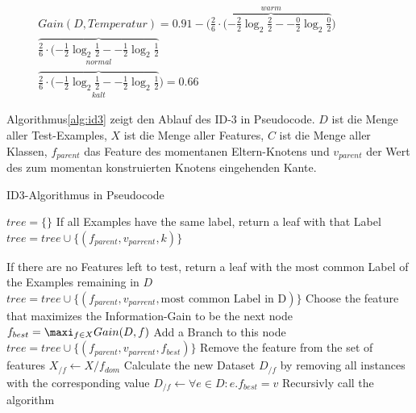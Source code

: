 \begin{equation}
\begin{split}
Gain(D,Temperatur) =  0.91 - \Big( \overbrace{\frac{2}{6} \cdot (-\frac{2}{2} \log_{2} \frac{2}{2} -  -\frac{0}{2} \log_{2} \frac{0}{2} }^{warm}   ) \quad \quad \quad \quad \\
\overbrace{\frac{2}{6} \cdot (-\frac{1}{2} \log_{2} \frac{1}{2} -  -\frac{1}{2} \log_{2} \frac{1}{2} }_{normal}   \quad \quad \quad \quad \\
\overbrace{\frac{2}{6} \cdot (-\frac{1}{2} \log_{2} \frac{1}{2} -  -\frac{1}{2} \log_{2} \frac{1}{2} }_{kalt} 
  \Big)  = 0.66
\end{split}
\end{equation}

Algorithmus\ref{alg:id3} zeigt den Ablauf des ID-3 in Pseudocode. $D$ ist die Menge aller Test-Examples, $X$ ist die Menge aller Features, $C$ ist die Menge aller Klassen, $f_{parent}$ das Feature des momentanen Eltern-Knotens und  $v_{parent}$ der Wert des zum momentan konstruierten Knotens eingehenden Kante. \cite[S. 139]{machine_marsland} \cite[S. 56]{machine_mitchell}

\begin{algorithm}[H]
	\footnotesize
	\caption{ID3-Algorithmus in Pseudocode}
	\label{alg:id3}
	\begin{algorithmic}[1]
		\State $tree = \{ \}$
		\State \Comment If all Examples have the same label, return a leaf with that Label
			\State $tree = tree \cup \{(f_{parent}, v_{parrent},k)\}$
			\State \Return 
	
		\Else
			\State \Comment If there are no Features left to test, return a leaf with 
			\State \Comment the most common Label  of the Examples remaining in $D$
				\State $tree = tree \cup \{(f_{parent}, v_{parrent}, \text{most common Label in D})\}$
				\State \Return 
			\Else
				\State \Comment Choose the feature that maximizes the Information-Gain to be the next node
				\State $f_{best} = \maxi_{f \in X} Gain(D,f)$
				\State \Comment Add a Branch to this node
				\State  $tree = tree \cup \{(f_{parent}, v_{parrent},f_{best})\}$
				\State \Comment Remove the feature from the set of features
				\State $X_{/f} \gets X / f_{dom}$
							\State \Comment Calculate the new Dataset $D_{/f}$ by removing all instances with the corresponding value
						\State $D_{/f} \gets \forall e \in D : e.f_{best} = v$
						\State \Comment Recursivly call the algorithm
						\State {}
				\EndFor
			\EndIf
		\EndIf
		
		\EndFunction
		
	\end{algorithmic}
\end{algorithm}

